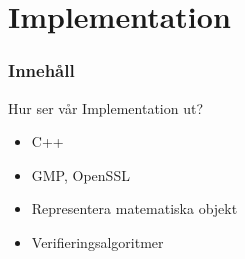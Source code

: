 \section{Implementation}
\begin{frame}
\frametitle{Innehåll}
\tableofcontents[currentsection]
\end{frame}

\begin{frame}{Hur ser vår Implementation ut?}

\begin{itemize}
\item C++
\item GMP, OpenSSL
\item Representera matematiska objekt
\item Verifieringsalgoritmer
\end{itemize}

\begin{center}
\end{center}

\end{frame}
